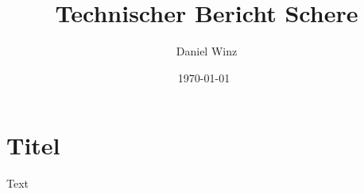 \documentclass[a4paper,10pt,fleqn]{article}
\title{Technischer Bericht Schere}
\author{Daniel Winz}
\date{\today~\dtc}
\begin{document}
\maketitle

% 

\tableofcontents
\newpage

% 
\section{Titel}
Text
\end{document}
